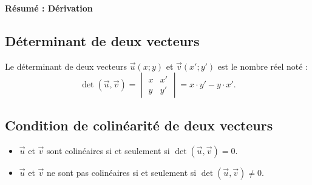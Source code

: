 \documentclass[12pt,a4paper]{article}
\theoremstyle{mystyle}
\begin{document}
\pagestyle{fancy}
\fancyhf{} %
\fancyfoot[C]{\thepage} %


\begin{center}
    \textbf{\Large Résumé : Dérivation}
\end{center}

\subsection*{Déterminant de deux vecteurs}

Le déterminant de deux vecteurs $\vec{u}(x; y)$ et $\vec{v}(x'; y')$ est le nombre réel noté :
\[
\det(\vec{u}, \vec{v}) = 
\begin{vmatrix}
x & x' \\
y & y'
\end{vmatrix} = x \cdot y' - y \cdot x'.
\]

\subsection*{Condition de colinéarité de deux vecteurs}

\begin{itemize}
    \item $\vec{u}$ et $\vec{v}$ sont colinéaires si et seulement si $\det(\vec{u}, \vec{v}) = 0$.
    \item $\vec{u}$ et $\vec{v}$ ne sont pas colinéaires si et seulement si $\det(\vec{u}, \vec{v}) \neq 0$.
\end{itemize}
\end{document}
